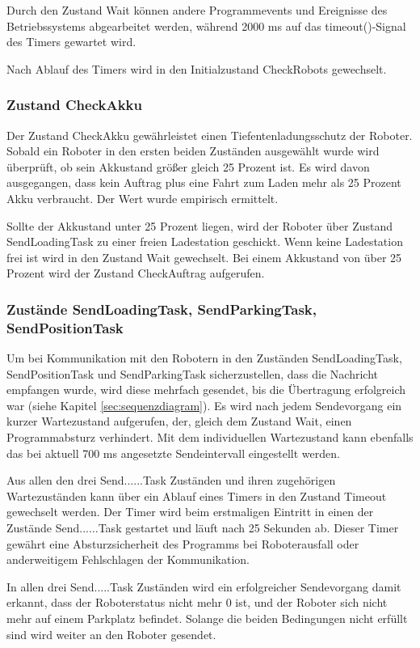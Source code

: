 Durch den Zustand Wait können andere Programmevents und Ereignisse des Betriebssystems abgearbeitet werden, während 2000 ms auf das timeout()-Signal des Timers gewartet wird. 

Nach Ablauf des Timers wird in den Initialzustand CheckRobots gewechselt.

\subsubsection{Zustand CheckAkku}

Der Zustand CheckAkku gewährleistet einen Tiefentenladungsschutz der Roboter. Sobald ein Roboter in den ersten beiden Zuständen ausgewählt wurde wird überprüft, ob sein Akkustand größer gleich 25 Prozent ist. Es wird davon ausgegangen, dass kein Auftrag plus eine Fahrt zum Laden mehr als 25 Prozent Akku verbraucht. Der Wert wurde empirisch ermittelt. 

Sollte der Akkustand unter 25 Prozent liegen, wird der Roboter über Zustand SendLoadingTask zu einer freien Ladestation geschickt. Wenn keine Ladestation frei ist wird in den Zustand Wait gewechselt. 
Bei einem Akkustand von über 25 Prozent wird der Zustand CheckAuftrag aufgerufen. 

\subsubsection{Zustände SendLoadingTask, SendParkingTask, SendPositionTask}

Um bei Kommunikation mit den Robotern in den Zuständen SendLoadingTask, SendPositionTask und SendParkingTask sicherzustellen, dass die Nachricht empfangen wurde, wird diese mehrfach gesendet, bis die Übertragung erfolgreich war (siehe Kapitel \ref{sec:sequenzdiagram}). Es wird nach jedem Sendevorgang ein kurzer Wartezustand aufgerufen, der, gleich dem Zustand Wait, einen Programmabsturz verhindert. Mit dem individuellen Wartezustand kann ebenfalls das bei aktuell 700 ms angesetzte Sendeintervall eingestellt werden. 

Aus allen den drei Send......Task Zuständen und ihren zugehörigen Wartezuständen kann über ein Ablauf eines Timers in den Zustand Timeout gewechselt werden. Der Timer wird beim erstmaligen Eintritt in einen der Zustände Send......Task gestartet und läuft nach 25 Sekunden ab. Dieser Timer gewährt eine Absturzsicherheit des Programms bei Roboterausfall oder anderweitigem Fehlschlagen der Kommunikation. 

In allen drei Send.....Task Zuständen wird ein erfolgreicher Sendevorgang damit erkannt, dass der Roboterstatus nicht mehr 0 ist, und der Roboter sich nicht mehr auf einem Parkplatz befindet. Solange die beiden Bedingungen nicht erfüllt sind wird weiter an den Roboter gesendet. 

